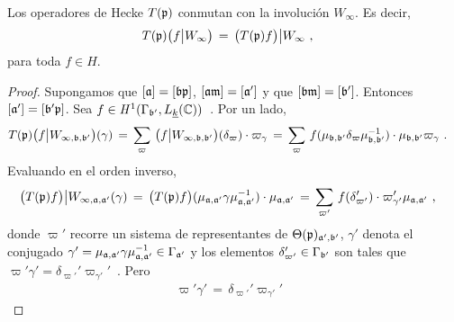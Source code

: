 \begin{propoInvolucionConmutaConHecke}\label{propo:involucionconmutaconhecke}
	Los operadores de Hecke $T(\frak{p})$ conmutan con la involuci\'{o}n
	$W_{\infty}$. Es decir,
	\begin{align*}
		T(\frak{p})\big(f\big\vert W_{\infty}\big) & \,=\,
			\big(T(\frak{p})f\big)\big\vert W_{\infty}
		\text{ ,}
	\end{align*}
	para toda $f\in H$.
\end{propoInvolucionConmutaConHecke}

\begin{proof}
	Supongamos que $[\frak{a}]=[\frak{b}\frak{p}]$,
	$[\frak{a}\frak{m}]=[\frak{a}']$ y que
	$[\frak{b}\frak{m}]=[\frak{b}']$. Entonces
	$[\frak{a}']=[\frak{b}'\frak{p}]$. Sea
	\begin{math}
		f\in\cohomolo[1]{\Gamma_{\frak{b}'},L_{\peso{k}}(\bb{C})}
	\end{math}~.
	Por un lado,
	\begin{align*}
		T(\frak{p})\big(f\big\vert W_{\infty,\frak{b},\frak{b}'}\big)
			(\gamma) & \,=\,\sum_{\varpi}\,\big(
			f\big\vert W_{\infty,\frak{b},\frak{b}'}\big)
				(\delta_{\varpi})\cdot\varpi_{\gamma} \,=\,
			\sum_{\varpi}\,f(\mu_{\frak{b},\frak{b}'}
			\delta_{\varpi}\mu_{\frak{b},\frak{b}'}^{-1})\cdot
				\mu_{\frak{b},\frak{b}'}\varpi_{\gamma}
		\text{ .}
	\end{align*}
	Evaluando en el orden inverso,
	\begin{align*}
		\big(T(\frak{p})f\big)\big\vert W_{\infty,\frak{a},\frak{a}'}
			(\gamma) & \,=\,\big(T(\frak{p})f\big)
				(\mu_{\frak{a},\frak{a}'}\gamma
					\mu_{\frak{a},\frak{a}'}^{-1})\cdot
					\mu_{\frak{a},\frak{a}'} \,=\,
			\sum_{\varpi'}\,f(\delta_{\varpi'}')\cdot
				\varpi_{\gamma'}'\mu_{\frak{a},\frak{a}'}
		\text{ ,}
	\end{align*}
	donde $\varpi'$ recorre un sistema de representantes de
	$\Theta(\frak{p})_{\frak{a}',\frak{b}'}$, $\gamma'$ denota el conjugado
	\begin{math}
		\gamma'=\mu_{\frak{a},\frak{a}'}\gamma
			\mu_{\frak{a},\frak{a}'}^{-1}\in\Gamma_{\frak{a}'}
	\end{math}
	y los elementos $\delta_{\varpi'}'\in\Gamma_{\frak{b}'}$ son tales que
	\begin{math}
		\varpi'\gamma'=\delta_{\varpi'}'\varpi_{\gamma'}'
	\end{math}~.
	Pero
	\begin{align*}
		\varpi'\gamma'\,=\,\delta_{\varpi'}'\varpi_{\gamma'}' &

\end{align*}
\end{proof}
